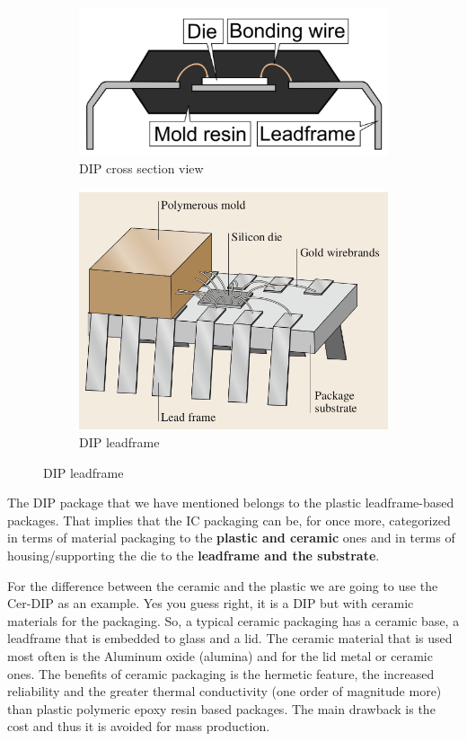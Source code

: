 \documentclass[final]{cubedoc}
\begin{document}
\begin{figure}[h!]
\centering
\begin{subfigure}{.5\textwidth}
  \centering
  \includegraphics[width=0.7\linewidth]{docs/pdip.png}
  \caption{DIP cross section view}
  \label{fig:sub1}
\end{subfigure}%
\begin{subfigure}{.5\textwidth}
  \centering
  \includegraphics[keepaspectratio, width=0.7\linewidth, height=.4\textheight]{docs/dip_leadframe.png}
  \caption{DIP leadframe}
  \label{fig:sub2}
\end{subfigure}
\label{fig:test}
\end{figure}

The DIP package that we have mentioned belongs to the plastic leadframe-based packages. That implies that the IC packaging can be, for once more, categorized in terms of material packaging to the \textbf{plastic and ceramic} ones and in terms of housing/supporting the die to the \textbf{leadframe and the substrate}.

For the difference between the ceramic and the plastic we are going to use the Cer-DIP as an example. Yes you guess right, it is a DIP but with ceramic materials for the packaging. So, a typical ceramic packaging has a ceramic base, a leadframe that is embedded to glass and a lid. The ceramic material that is used most often is the Aluminum oxide (alumina) and for the lid metal or ceramic ones. The benefits of ceramic packaging is the hermetic feature, the increased reliability and the greater thermal conductivity (one order of magnitude more) than plastic polymeric epoxy resin based packages. The main drawback is the cost and thus it is avoided for mass production. 
\end{document}
